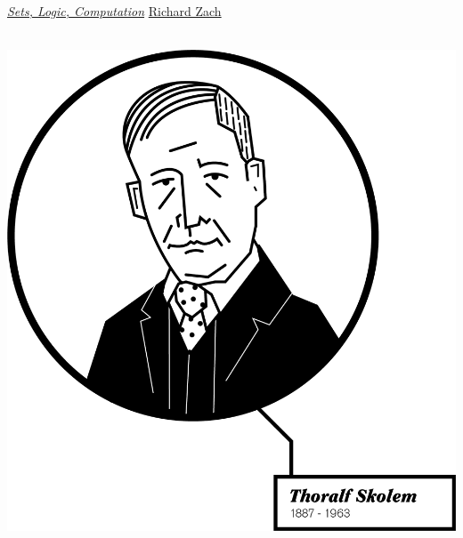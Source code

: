 \noindent
\oluselicense
{\href{https://github.com/rzach/phil379}{\textit{Sets, Logic,
Computation}}}
{\href{http://richardzach.org/}{Richard Zach}}

\newpage
\pagestyle{leadbeater}
\tableofcontents*

\cleartoverso
\thispagestyle{empty}
\ \vfill
\noindent\hskip-1cm\includegraphics{illustrations/SkolemChapter}
\vfill



\cleartoverso 


